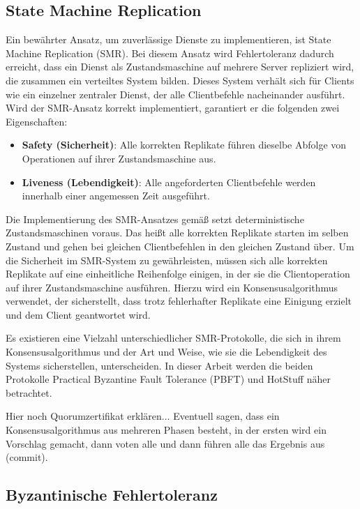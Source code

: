 \documentclass[nonacm,sigconf,natbib=false]{acmart}
\begin{document}
\subsection{State Machine Replication}

Ein bewährter Ansatz, um zuverlässige Dienste zu implementieren, ist State Machine Replication (SMR)\cite{smr-lamport}\cite{smr-schneider}. Bei diesem Ansatz wird Fehlertoleranz dadurch erreicht, dass ein Dienst als Zustandsmaschine auf mehrere Server repliziert wird, die zusammen ein verteiltes System bilden. Dieses System verhält sich für Clients wie ein einzelner zentraler Dienst, der alle Clientbefehle nacheinander ausführt. Wird der SMR-Ansatz korrekt implementiert, garantiert er die folgenden zwei Eigenschaften:
\begin{itemize}
  \item \textbf{Safety (Sicherheit)}: Alle korrekten Replikate führen dieselbe Abfolge von Operationen auf ihrer Zustandsmaschine aus.
  \item \textbf{Liveness (Lebendigkeit)}: Alle angeforderten Clientbefehle werden innerhalb einer angemessen Zeit ausgeführt.
\end{itemize}

Die Implementierung des SMR-Ansatzes gemäß \cite{smr-schneider} setzt deterministische Zustandsmaschinen voraus. Das heißt alle korrekten Replikate starten im selben Zustand und gehen bei gleichen Clientbefehlen in den gleichen Zustand über. Um die Sicherheit im SMR-System zu gewährleisten, müssen sich alle korrekten Replikate auf eine einheitliche Reihenfolge einigen, in der sie die Clientoperation auf ihrer Zustandsmaschine ausführen. Hierzu wird ein Konsensusalgorithmus verwendet, der sicherstellt, dass trotz fehlerhafter Replikate eine Einigung erzielt und dem Client geantwortet wird.

Es existieren eine Vielzahl unterschiedlicher SMR-Protokolle, die sich in ihrem Konsensusalgorithmus und der Art und Weise, wie sie die Lebendigkeit des Systems sicherstellen, unterscheiden. In dieser Arbeit werden die beiden Protokolle Practical Byzantine Fault Tolerance (PBFT)\cite{pbft} und HotStuff\cite{hotstuff} näher betrachtet.

Hier noch Quorumzertifikat erklären...
Eventuell sagen, dass ein Konsensusalgorithmus aus mehreren Phasen besteht, in der ersten wird ein Vorschlag gemacht, dann voten alle und dann führen alle das Ergebnis aus (commit).

\subsection{Byzantinische Fehlertoleranz}
\end{document}
